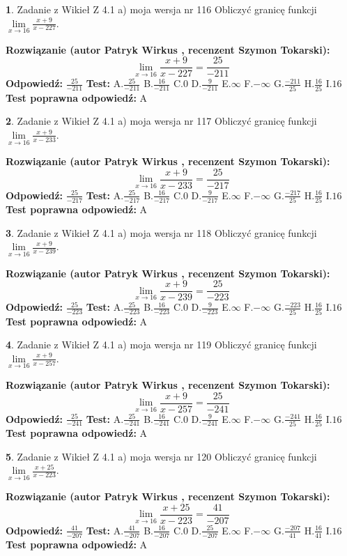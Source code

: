 \documentclass[12pt, a4paper]{article}
\theoremstyle{definition} %
\newtheorem{zad}{}
\newcommand{\zadStart}[1]{\begin{zad}#1\newline}
\newcommand{\zadStop}{\end{zad}}
\newcommand{\rozwStart}[2]{\noindent \textbf{Rozwiązanie (autor #1 , recenzent #2): }\newline}
\newcommand{\rozwStop}{\newline}
\newcommand{\odpStart}{\noindent \textbf{Odpowiedź:}\newline}
\newcommand{\odpStop}{\newline}
\newcommand{\testStart}{\noindent \textbf{Test:}\newline}
\newcommand{\testStop}{\newline}
\newcommand{\kluczStart}{\noindent \textbf{Test poprawna odpowiedź:}\newline}
\newcommand{\kluczStop}{\newline}
\begin{document}
\zadStart{Zadanie z Wikieł Z 4.1 a) moja wersja nr 116}
Obliczyć granicę funkcji $\lim\limits_{x\to16}\frac{x+9}{x-227}$.
\zadStop
\rozwStart{Patryk Wirkus}{Szymon Tokarski}
$$\lim\limits_{x\to16}\frac{x+9}{x-227} = \frac{25}{-211}$$
\rozwStop
\odpStart
$\frac{25}{-211}$
\odpStop
\testStart
A.$\frac{25}{-211}$
B.$\frac{16}{-211}$
C.$0$
D.$\frac{9}{-211}$
E.$\infty$
F.$-\infty$
G.$\frac{-211}{25}$
H.$\frac{16}{25}$
I.$16$
\testStop
\kluczStart
A
\kluczStop



\zadStart{Zadanie z Wikieł Z 4.1 a) moja wersja nr 117}
Obliczyć granicę funkcji $\lim\limits_{x\to16}\frac{x+9}{x-233}$.
\zadStop
\rozwStart{Patryk Wirkus}{Szymon Tokarski}
$$\lim\limits_{x\to16}\frac{x+9}{x-233} = \frac{25}{-217}$$
\rozwStop
\odpStart
$\frac{25}{-217}$
\odpStop
\testStart
A.$\frac{25}{-217}$
B.$\frac{16}{-217}$
C.$0$
D.$\frac{9}{-217}$
E.$\infty$
F.$-\infty$
G.$\frac{-217}{25}$
H.$\frac{16}{25}$
I.$16$
\testStop
\kluczStart
A
\kluczStop



\zadStart{Zadanie z Wikieł Z 4.1 a) moja wersja nr 118}
Obliczyć granicę funkcji $\lim\limits_{x\to16}\frac{x+9}{x-239}$.
\zadStop
\rozwStart{Patryk Wirkus}{Szymon Tokarski}
$$\lim\limits_{x\to16}\frac{x+9}{x-239} = \frac{25}{-223}$$
\rozwStop
\odpStart
$\frac{25}{-223}$
\odpStop
\testStart
A.$\frac{25}{-223}$
B.$\frac{16}{-223}$
C.$0$
D.$\frac{9}{-223}$
E.$\infty$
F.$-\infty$
G.$\frac{-223}{25}$
H.$\frac{16}{25}$
I.$16$
\testStop
\kluczStart
A
\kluczStop



\zadStart{Zadanie z Wikieł Z 4.1 a) moja wersja nr 119}
Obliczyć granicę funkcji $\lim\limits_{x\to16}\frac{x+9}{x-257}$.
\zadStop
\rozwStart{Patryk Wirkus}{Szymon Tokarski}
$$\lim\limits_{x\to16}\frac{x+9}{x-257} = \frac{25}{-241}$$
\rozwStop
\odpStart
$\frac{25}{-241}$
\odpStop
\testStart
A.$\frac{25}{-241}$
B.$\frac{16}{-241}$
C.$0$
D.$\frac{9}{-241}$
E.$\infty$
F.$-\infty$
G.$\frac{-241}{25}$
H.$\frac{16}{25}$
I.$16$
\testStop
\kluczStart
A
\kluczStop



\zadStart{Zadanie z Wikieł Z 4.1 a) moja wersja nr 120}
Obliczyć granicę funkcji $\lim\limits_{x\to16}\frac{x+25}{x-223}$.
\zadStop
\rozwStart{Patryk Wirkus}{Szymon Tokarski}
$$\lim\limits_{x\to16}\frac{x+25}{x-223} = \frac{41}{-207}$$
\rozwStop
\odpStart
$\frac{41}{-207}$
\odpStop
\testStart
A.$\frac{41}{-207}$
B.$\frac{16}{-207}$
C.$0$
D.$\frac{25}{-207}$
E.$\infty$
F.$-\infty$
G.$\frac{-207}{41}$
H.$\frac{16}{41}$
I.$16$
\testStop
\kluczStart
A
\kluczStop
\end{document}
